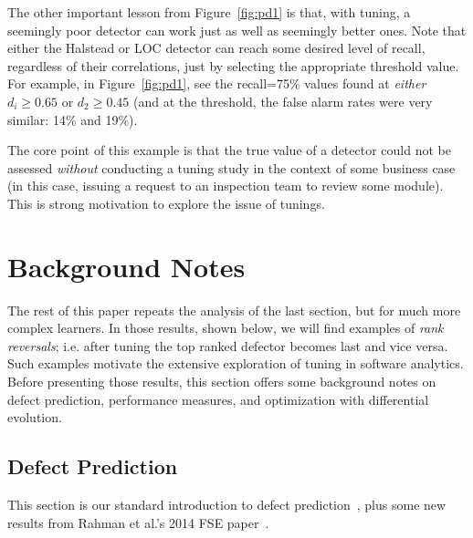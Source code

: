 \documentclass{sig-alternative}
\newcommand{\fig}[1]{Figure~\ref{fig:#1}}
\begin{document}
The other  important lesson from   \fig{pd1}  is that, with tuning, a seemingly poor
detector can work just as well as seemingly better ones.
Note that either the Halstead or LOC detector can reach some desired
level of recall, regardless of their correlations, just by
selecting the appropriate threshold value. For example, in \fig{pd1}, see the recall=75\% values
found at {\em either} $d_i\ge 0.65$ or $d_2\ge 0.45$ (and at the threshold, the false alarm rates
were very similar: 14\% and 19\%).

The core point of this example is that    the true value of a detector
could not be assessed {\em without} conducting a  tuning study in the context of some business case (in this case, 
issuing a request to an inspection team to review some module).  
This is strong motivation to explore the issue of tunings.



\section{Background Notes}



The rest of this paper repeats the analysis of the last section, but for much
more complex learners. In those results, shown  below, we will find
examples of {\em rank reversals};
i.e.  after tuning the top ranked defector becomes last and vice versa.
Such examples motivate the extensive exploration of tuning in software analytics.
Before presenting those results, this section offers some background notes on defect prediction,
performance measures, and optimization with differential evolution.

\subsection{Defect Prediction}


This section is our standard introduction to defect prediction~\cite{me15:book1},
plus   some new results from Rahman et al.'s   2014 FSE paper~\cite{rahman14:icse}. 
 
\end{document}
